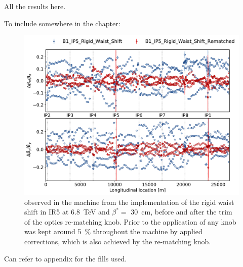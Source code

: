 All the results here.

To include somewhere in the chapter:

\begin{figure}[!thb]
    \centering
    \includegraphics*[width=\columnwidth]{Figures/Chapter6/ir5_rws_rematching.pdf}
    \caption{\betabeating observed in the machine from the implementation of the rigid waist shift in IR5 at \qty{6.8}{\tera\electronvolt} and \(\beta^{*}=\) \qty{30}{\centi\meter}, before and after the trim of the optics re-matching knob. Prior to the application of any knob \betabeating was kept around \qty{5}{\percent} throughout the machine by applied corrections, which is also achieved by the re-matching knob.}
    \label{fig:ir5_rws_rematching}
\end{figure}

Can refer to appendix  for the fills used.

